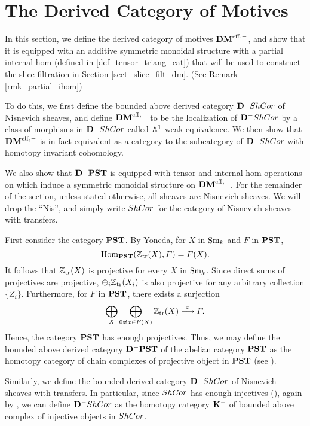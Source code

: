 \newpage
\section{The Derived Category of Motives}\label{sect_dmeff_and_dm}

In this section, we define the derived category of motives $\DMeff$,
and show that it is equipped with an additive symmetric monoidal 
structure with a partial internal hom (defined in 
\ref{def_tensor_triang_cat}) that will be used to construct the 
slice filtration in Section \ref{sect_slice_filt_dm}. (See Remark 
\ref{rmk_partial_ihom})

To do this, we first define the bounded above derived category 
$\DCat^-\ShCor$ of Nisnevich sheaves, and define $\DMeff$ to be
the localization of $\DCat^-\ShCor$ by a class of morphisms in
$\DCat^-\ShCor$ called $\A^1$-weak equivalence. We then show that
$\DMeff$ is in fact equivalent as a category to the subcategory
of $\DCat^-\ShCor$ with homotopy invariant cohomology. 

We also show that $\DCat^-\PST$ is equipped with tensor and 
internal hom operations on which induce a symmetric monoidal 
structure on $\DMeff$. For the remainder of the section, unless 
stated otherwise, all sheaves are Nisnevich sheaves. We will drop 
the ``Nis'', and simply write $\ShCor$ for the category of 
Nisnevich sheaves with transfers.

First consider the category $\PST$. By Yoneda, for $X$ in $\Sm$ and
$F$ in $\PST$,
\[
\hom_{\PST}(\Ztr(X), F) = F(X).
\]
It follows that $\Ztr(X)$ is projective for every $X$ in $\Sm$.
Since direct sums of projectives are projective, 
$\oplus_i \Ztr(X_i)$ is also projective for any arbitrary 
collection $\{Z_i\}$. Furthermore, for $F$ in $\PST$, there exists 
a surjection
\begin{equation}\label{eq_res_by_rep}
\bigoplus_{X} \bigoplus_{0 \neq x \in F(X)} \Ztr(X) 
   \stackrel{x}{\to} F.
\end{equation}
Hence, the category $\PST$ has enough projectives. Thus, we may 
define the bounded above derived category $\DCat[D]^-\PST$ of the 
abelian category $\PST$ as the homotopy category of chain 
complexes of projective object in $\PST$ (see 
\cite[10.4.8]{WH}).

Similarly, we define the bounded derived category $\DCat^- \ShCor$
of Nisnevich sheaves with transfers. In particular, since $\ShCor$
has enough injectives (\cite[13.1]{MVW}), again by 
\cite[10.4.8]{WH}, we can define $\DCat^-\ShCor$ as the homotopy
category $\DCat[K]^-$ of bounded above complex of injective objects
in $\ShCor$. 

